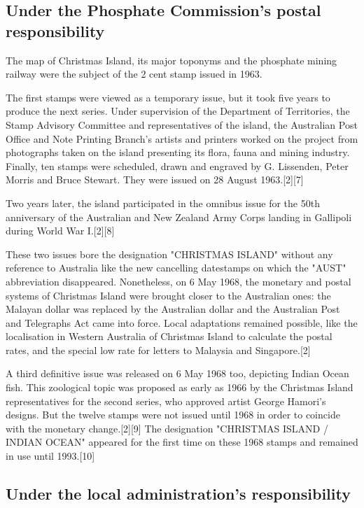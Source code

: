 \subsection{Under the Phosphate Commission's postal responsibility}


The map of Christmas Island, its major toponyms and the phosphate mining railway were the subject of the 2 cent stamp issued in 1963.

The first stamps were viewed as a temporary issue, but it took 
five years to produce the next series. Under supervision of the 
Department of Territories, the Stamp Advisory Committee and 
representatives of the island, the Australian Post Office and 
Note Printing Branch's artists and printers worked on the 
project from photographs taken on the island presenting its 
flora, fauna and mining industry. Finally, ten stamps were 
scheduled, drawn and engraved by G. Lissenden, Peter Morris and 
Bruce Stewart. They were issued on 28 August 1963.[2][7]


Two years later, the island participated in the omnibus issue for the 50th anniversary of the Australian and New Zealand Army Corps landing in Gallipoli during World War I.[2][8]

These two issues bore the designation "CHRISTMAS ISLAND" without any reference to Australia like the new cancelling datestamps on which the "AUST" abbreviation disappeared. Nonetheless, on 6 May 1968, the monetary and postal systems of Christmas Island were brought closer to the Australian ones: the Malayan dollar was replaced by the Australian dollar and the Australian Post and Telegraphs Act came into force. Local adaptations remained possible, like the localisation in Western Australia of Christmas Island to calculate the postal rates, and the special low rate for letters to Malaysia and Singapore.[2]

A third definitive issue was released on 6 May 1968 too, depicting Indian Ocean fish. This zoological topic was proposed as early as 1966 by the Christmas Island representatives for the second series, who approved artist George Hamori's designs. But the twelve stamps were not issued until 1968 in order to coincide with the monetary change.[2][9] The designation "CHRISTMAS ISLAND / INDIAN OCEAN" appeared for the first time on these 1968 stamps and remained in use until 1993.[10]

\subsection{Under the local administration's responsibility}

